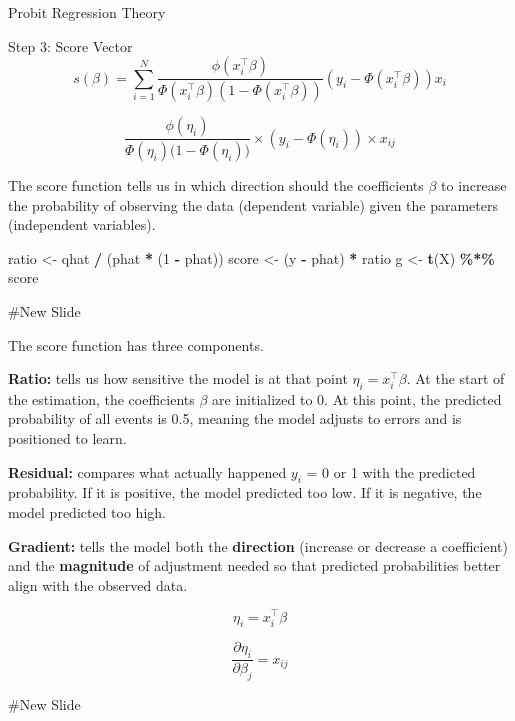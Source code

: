 \documentclass[
  ignorenonframetext,
]{beamer}
\newenvironment{Shaded}{\begin{snugshade}}{\end{snugshade}}
\newcommand{\DecValTok}[1]{\textcolor[rgb]{0.00,0.00,0.81}{#1}}
\newcommand{\FunctionTok}[1]{\textcolor[rgb]{0.13,0.29,0.53}{\textbf{#1}}}
\newcommand{\NormalTok}[1]{#1}
\newcommand{\OtherTok}[1]{\textcolor[rgb]{0.56,0.35,0.01}{#1}}
\newcommand{\SpecialCharTok}[1]{\textcolor[rgb]{0.81,0.36,0.00}{\textbf{#1}}}
\begin{document}
\begin{frame}[fragile]{Probit Regression Theory}
\begin{block}{Step 3: Score Vector}
\protect{}\label{step-3-score-vector}
\[
s(\beta) = \sum_{i=1}^{N} \frac{\phi(x_i^\top \beta)}{\Phi(x_i^\top \beta)\left(1 - \Phi(x_i^\top \beta)\right)} \left(y_i - \Phi(x_i^\top \beta)\right) x_i
\]

\[
\frac{\phi(\eta_i)}{\Phi(\eta_i)\big(1 - \Phi(\eta_i)\big)}
\times (y_i - \Phi(\eta_i))
\times x_{ij}
\]

The score function tells us in which direction should the coefficients
\(\beta\) to increase the probability of observing the data (dependent
variable) given the parameters (independent variables).

\begin{Shaded}
\begin{Highlighting}[]
\NormalTok{ratio }\OtherTok{\textless{}{-}}\NormalTok{ qhat }\SpecialCharTok{/}\NormalTok{ (phat }\SpecialCharTok{*}\NormalTok{ (}\DecValTok{1} \SpecialCharTok{{-}}\NormalTok{ phat))}
\NormalTok{score }\OtherTok{\textless{}{-}}\NormalTok{ (y }\SpecialCharTok{{-}}\NormalTok{ phat) }\SpecialCharTok{*}\NormalTok{ ratio}
\NormalTok{g     }\OtherTok{\textless{}{-}} \FunctionTok{t}\NormalTok{(X) }\SpecialCharTok{\%*\%}\NormalTok{ score}
\end{Highlighting}
\end{Shaded}

\#New Slide

The score function has three components.

\textbf{Ratio:} tells us how sensitive the model is at that point
\(\eta_i = x_i^\top \beta\). At the start of the estimation, the
coefficients \(\beta\) are initialized to 0. At this point, the
predicted probability of all events is 0.5, meaning the model adjusts to
errors and is positioned to learn.

\textbf{Residual:} compares what actually happened \(y_i\) = 0 or 1 with
the predicted probability. If it is positive, the model predicted too
low. If it is negative, the model predicted too high.

\textbf{Gradient:} tells the model both the \textbf{direction} (increase
or decrease a coefficient) and the \textbf{magnitude} of adjustment
needed so that predicted probabilities better align with the observed
data.

\[
\eta_i = x_i^\top \beta
\]

\[
\frac{\partial \eta_i}{\partial \beta_j} = x_{ij}
\]

\#New Slide
\end{block}


\end{frame}
\end{document}
